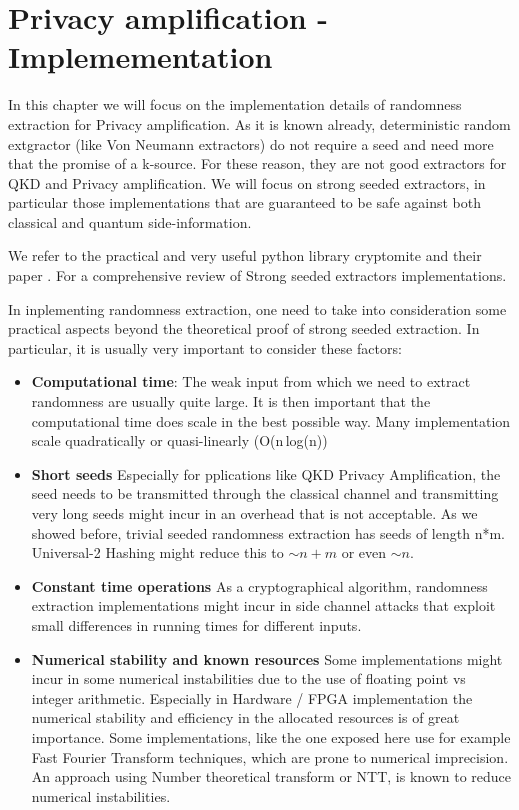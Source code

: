 \chapter{Privacy amplification - Implemementation} \label{chap:PA_impl} %

In this chapter we will focus on the implementation details of randomness extraction for Privacy amplification. 
As it is known already, deterministic random extgractor (like Von Neumann extractors) do not require a seed and need more that the promise of a k-source. For these reason, they are not good extractors for QKD and Privacy amplification. We will focus on strong seeded extractors, in particular those implementations that are guaranteed to be safe against both classical and quantum side-information. 

We refer to the practical and very useful python library cryptomite and their paper \cite{Cryptomite}. For a comprehensive review of Strong seeded extractors implementations. 

In inplementing randomness extraction, one need to take into consideration some practical aspects beyond the theoretical proof of strong seeded extraction. In particular, it is usually very important to consider these factors:

\begin{itemize}
	\item \textbf{Computational time}: The weak input from which we need to extract randomness are usually quite large. It is then important that the computational time does scale in the best possible way. Many implementation scale quadratically or quasi-linearly (O(n\,log(n))
	\item \textbf{Short seeds} Especially for pplications like QKD Privacy Amplification, the seed needs to be transmitted through the classical channel and transmitting very long seeds might incur in an overhead that is not acceptable. As we showed before, trivial seeded randomness extraction has seeds of length n*m. Universal-2 Hashing might reduce this to $\sim n + m$ or even $\sim n$.
	\item \textbf{Constant time operations} As a cryptographical algorithm, randomness extraction implementations might incur in side channel attacks that exploit small differences in running times for different inputs.
	\item \textbf{Numerical stability and known resources} Some implementations might incur in some numerical instabilities due to the use of floating point vs integer arithmetic. Especially in Hardware / FPGA implementation the numerical stability and efficiency in the allocated resources is of great importance. Some implementations, like the one exposed here use for example Fast Fourier Transform techniques, which are prone to numerical imprecision. An approach using Number theoretical transform or NTT, is known to reduce numerical instabilities.
\end{itemize}

